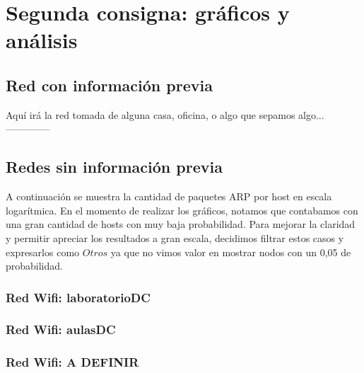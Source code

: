 \section{Segunda consigna: gráficos y análisis}

\subsection{Red con información previa}
Aquí irá la red tomada de alguna casa, oficina, o algo que sepamos algo...--------------

\subsection{Redes sin información previa}
A continuación se muestra la cantidad de paquetes ARP por host en escala logarítmica. 
En el momento de realizar los gráficos, notamos que contabamos con una gran cantidad de hosts con muy baja probabilidad. 
Para mejorar la claridad y permitir apreciar los resultados a gran escala, decidimos filtrar estos casos y expresarlos como $Otros$ ya que 
no vimos valor en mostrar nodos con un 0,05 de probabilidad.\\

\subsubsection{Red Wifi: laboratorioDC}


\newpage
\subsubsection{Red Wifi: aulasDC}


\newpage
\subsubsection{Red Wifi: A DEFINIR}